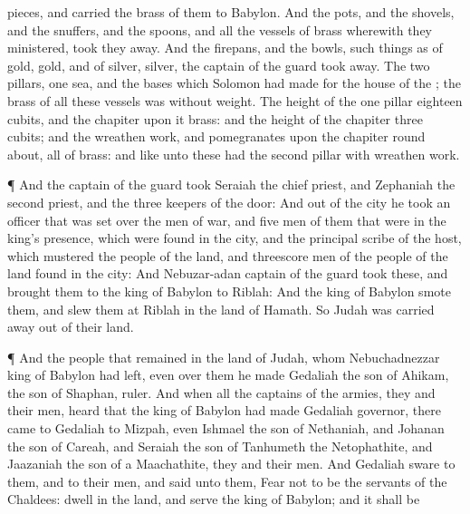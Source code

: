 {pieces, and
carried the
brass of them to
Babylon.
And the
pots, and the
shovels, and the
snuffers, and the
spoons, and all the
vessels of
brass wherewith they
ministered, took they
away.
And the
firepans, and the
bowls,
{} such things as
{} of
gold,
{}
gold, and of
silver,
{}
silver, the
captain of the
guard took
away.
The
two
pillars,
one
sea, and the
bases which
Solomon had
made for the
house of the
{}; the
brass of all these
vessels was
without
weight.
The
height of the
one
pillar
{}
eighteen
cubits, and the
chapiter upon it
{}
brass: and the
height of the
chapiter
three
cubits; and the wreathen
work, and
pomegranates upon the
chapiter round
about, all of
brass: and like unto these had the
second
pillar with wreathen
work.
\par }{\PP {}¶ And the
captain of the
guard
took
Seraiah the
chief
priest, and
Zephaniah the
second
priest, and the
three
keepers of the
door:
And out of the
city he
took
an
officer that was
set over the
men of
war, and
five
men of them that
were in the
king’s
presence, which were
found in the
city, and the
principal
scribe of the
host, which
mustered the
people of the
land, and
threescore
men of the
people of the
land
{}
found in the
city:
And
Nebuzar-adan
captain of the
guard
took these, and
brought them to the
king of
Babylon to
Riblah:
And the
king of
Babylon
smote them, and
slew them at
Riblah in the
land of
Hamath. So
Judah was carried
away out of their
land.
\par }{\PP {}¶ And
{} the
people that
remained in the
land of
Judah, whom
Nebuchadnezzar
king of
Babylon had
left, even over them he made
Gedaliah the
son of
Ahikam, the
son of
Shaphan,
ruler.
And when all the
captains of the
armies, they and their
men,
heard that the
king of
Babylon had made
Gedaliah
governor, there
came to
Gedaliah to
Mizpah, even
Ishmael the
son of
Nethaniah, and
Johanan the
son of
Careah, and
Seraiah the
son of
Tanhumeth the
Netophathite, and
Jaazaniah the
son of a
Maachathite, they and their
men.
And
Gedaliah
sware to them, and to their
men, and
said unto them,
Fear not to be the
servants of the
Chaldees:
dwell in the
land, and
serve the
king of
Babylon; and it shall be
}
